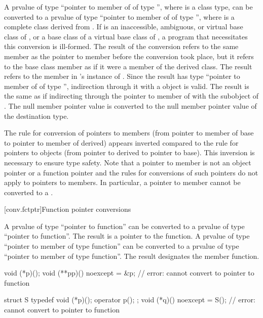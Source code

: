 \pnum
A prvalue of type ``pointer to member of  of type \cv{}
'', where  is a class type, can be converted to
a prvalue of type ``pointer to member of  of type \cv{}
'', where  is a complete class derived
from . If  is an
inaccessible,
ambiguous, or virtual base
class of , or a base class of a virtual base class of
, a program that necessitates this conversion is ill-formed.
The result of the conversion refers to the same member as the pointer to
member before the conversion took place, but it refers to the base class
member as if it were a member of the derived class. The result refers to
the member in 's instance of . Since the result has
type ``pointer to member of  of type \cv{} '',
indirection through it with a  object is valid. The result is the same
as if indirecting through the pointer to member of  with the
 subobject of . The null member pointer value is
converted to the null member pointer value of the destination
type.
\begin{footnote}
The rule for conversion of pointers to members (from pointer to member
of base to pointer to member of derived) appears inverted compared to
the rule for pointers to objects (from pointer to derived to pointer to
base). This inversion is
necessary to ensure type safety. Note that a pointer to member is not
an object pointer or a function pointer
and the rules for conversions
of such pointers do not apply to pointers to members.
%
In particular, a pointer to member cannot be converted to a
.
\end{footnote}

[conv.fctptr]{Function pointer conversions}

\pnum
{}%
A prvalue of type ``pointer to  function''
can be converted to a prvalue of type ``pointer to function''.
The result is a pointer to the function.
A prvalue of type ``pointer to member of type  function''
can be converted to a prvalue of type ``pointer to member of type function''.
The result designates the member function.

\begin{example}
\begin{codeblock}
void (*p)();
void (**pp)() noexcept = &p;    // error: cannot convert to pointer to  function

struct S { typedef void (*p)(); operator p(); };
void (*q)() noexcept = S();     // error: cannot convert to pointer to  function
\end{codeblock}
\end{example}

